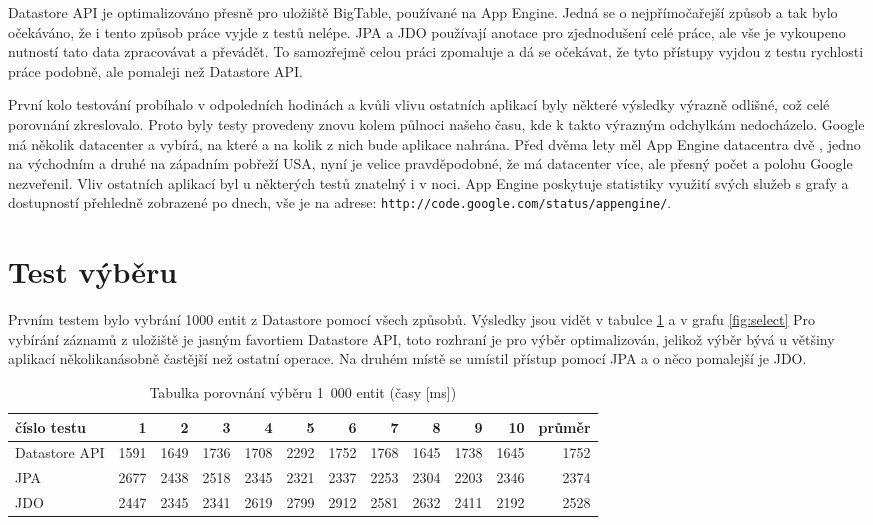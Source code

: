Datastore API je optimalizováno přesně pro uložiště BigTable, používané na App Engine. Jedná se o nejpřímočařejší způsob a tak bylo očekáváno, že i tento způsob práce vyjde z testů nelépe. JPA a JDO používají anotace pro zjednodušení celé práce, ale vše je vykoupeno nutností tato data zpracovávat a převádět. To samozřejmě celou práci zpomaluje a dá se očekávat, že tyto přístupy vyjdou z testu rychlosti práce podobně, ale pomaleji než Datastore API.

První kolo testování probíhalo v odpoledních hodinách a kvůli vlivu ostatních aplikací byly některé výsledky výrazně odlišné, což celé porovnání zkreslovalo. Proto byly testy provedeny znovu kolem půlnoci našeho času, kde k takto výrazným odchylkám nedocházelo. Google má několik datacenter a vybírá, na které a na kolik z nich bude aplikace nahrána. Před dvěma lety měl App Engine datacentra dvě , jedno na východním a druhé na západním pobřeží USA, nyní je velice pravděpodobné, že má datacenter více, ale přesný počet a polohu Google nezveřenil. Vliv ostatních aplikací byl u některých testů znatelný i v noci. App Engine poskytuje statistiky využití svých služeb s grafy a dostupností přehledně zobrazené po dnech, vše je na  adrese: \verb|http://code.google.com/status/appengine/|.

\section{Test výběru}
Prvním testem bylo vybrání 1000 entit z Datastore pomocí všech způsobů. Výsledky jsou vidět v tabulce \ref{tab:select} a v grafu \ref{fig:select} Pro vybírání záznamů z uložiště je jasným favortiem Datastore API, toto rozhraní je pro výběr optimalizován, jelikož výběr bývá u většiny aplikací několikanásobně častější než ostatní operace. Na druhém místě se umístil přístup pomocí JPA a o něco pomalejší je JDO.

\begin{table}[h]
\centering
\caption{Tabulka porovnání výběru 1~000 entit (časy [ms])}\label{tab:select}
\begin{tabular}{|l|r|r|r|r|r|r|r|r|r|r|r|}
   \hline
číslo testu	& 1		& 2		& 3		& 4		& 5		& 6		& 7		& 8		& 9		& 10		& průměr \\
   \hline
Datastore API	& 1591	& 1649	& 1736	& 1708	& 2292	& 1752	& 1768	& 1645	& 1738	& 1645	& 1752 \\
JPA	& 2677	& 2438	& 2518	& 2345	& 2321	& 2337	& 2253	& 2304	& 2203	& 2346	& 2374 \\
JDO	& 2447	& 2345	& 2341	& 2619	& 2799	& 2912	& 2581	& 2632	& 2411	& 2192	& 2528 \\
   \hline
\end{tabular}
\end{table}

